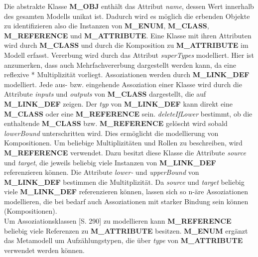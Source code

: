 Die abstrakte Klasse \textbf{M\_OBJ} enth\"alt das Attribut \textit{name}, dessen Wert innerhalb des gesamten Modells unikat ist. Dadurch wird es m\"oglich die erbenden Objekte zu identifizieren also die Instanzen von \textbf{M\_ENUM}, \textbf{M\_CLASS}, \textbf{M\_REFERENCE} und \textbf{M\_ATTRIBUTE}.
Eine Klasse mit ihren Attributen wird durch \textbf{M\_CLASS} und durch die Komposition zu \textbf{M\_ATTRIBUTE} im Modell erfasst. Vererbung wird durch das Attribut \textit{superTypes} modelliert. Hier ist anzumerken, dass auch Mehrfachvererbung dargestellt werden kann, da eine reflexive * Multiplizität vorliegt. 
Assoziationen werden durch \textbf{M\_LINK\_DEF} modelliert. Jede aus- bzw. eingehende Assoziation einer Klasse wird durch die Attribute \textit{inputs} und \textit{outputs} von \textbf{M\_CLASS} dargestellt, die auf \textbf{M\_LINK\_DEF} zeigen. Der \textit{typ} von \textbf{M\_LINK\_DEF} kann direkt eine \textbf{M\_CLASS} oder eine \textbf{M\_REFERENCE} sein. \textit{deleteIfLower} bestimmt, ob die enthaltende \textbf{M\_CLASS} bzw. \textbf{M\_REFERENCE} gel\"oscht wird sobald \textit{lowerBound} unterschritten wird. Dies erm\"oglicht die modellierung von Kompositionen. Um beliebige Multiplizitäten und Rollen zu beschreiben, wird \textbf{M\_REFERENCE} verwendet. Dazu besitzt diese Klasse die Attribute \textit{source} und \textit{target}, die jeweils beliebig viele Instanzen von \textbf{M\_LINK\_DEF} referenzieren können. Die Attribute \textit{lower-} und \textit{upperBound} von \textbf{M\_LINK\_DEF} bestimmen die Multitplizität. Da \textit{source} und \textit{target} beliebig viele \textbf{M\_LINK\_DEF} referenzieren k\"onnen, lassen sich so n-\"are Assoziationen modellieren, die bei bedarf auch Assoziationen mit starker Bindung sein k\"onnen (Kompositionen).\\
Um Assoziationsklassen \cite{larman2005book}[S. 290] zu modellieren kann \textbf{M\_\-REF\-ER\-ENCE} beliebig viele Referenzen zu \textbf{M\_AT\-TRI\-BUTE} besitzen. \textbf{M\_ENUM} erg\"anzt das Metamodell um Aufz\"ahlungstypen, die \"uber \textit{type} von \textbf{M\_ATTRIBUTE} verwendet werden k\"onnen.\\
